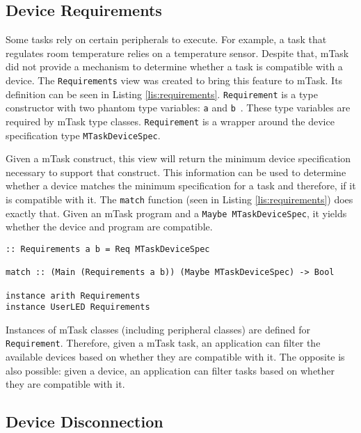 \subsection{Device Requirements}

Some tasks rely on certain peripherals to execute. For example, a task that regulates room temperature relies on a temperature sensor. Despite that, \gls{mTask} did not provide a mechanism to determine whether a task is compatible with a device. The \texttt{Requirements} view was created to bring this feature to \gls{mTask}. Its definition can be seen in Listing \ref{lis:requirements}. \texttt{Requirement} is a type constructor with two phantom type variables: \texttt{a} and \texttt{b}~\cite{phantom}. These type variables are required by \gls{mTask} type classes. \texttt{Requirement} is a wrapper around the device specification type \texttt{MTaskDeviceSpec}. 

Given a \gls{mTask} construct, this view will return the minimum device specification necessary to support that construct. This information can be used to determine whether a device matches the minimum specification for a task and therefore, if it is compatible with it. The \texttt{match} function (seen in Listing \ref{lis:requirements}) does exactly that. Given an \gls{mTask} program and a \texttt{Maybe MTaskDeviceSpec}, it yields whether the device and program are compatible.

\begin{lstlisting}[caption=The \texttt{Requirements} view,captionpos=b,label=lis:requirements]
:: Requirements a b = Req MTaskDeviceSpec

match :: (Main (Requirements a b)) (Maybe MTaskDeviceSpec) -> Bool

instance arith Requirements
instance UserLED Requirements 
\end{lstlisting}

Instances of \gls{mTask} classes (including peripheral classes) are defined for \texttt{Requirement}. Therefore, given a \gls{mTask} task, an application can filter the available devices based on whether they are compatible with it. The opposite is also possible: given a device, an application can filter tasks based on whether they are compatible with it.

\subsection{Device Disconnection}\label{sec:dev_disc}

